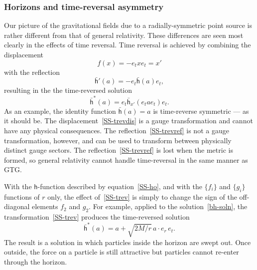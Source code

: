 \documentclass[a4paper]{article}
\numberwithin{equation}{section}
\newcommand{\dt}{\! \cdot \!}
\newcommand{\lih}{\mathsf{h}}
\newcommand{\lbh}{\bar{\mathsf{h}}}
\newcommand{\ho}{\lbh}
\begin{document}
\subsubsection*{Horizons and time-reversal asymmetry}

Our picture of the gravitational fields due to a radially-symmetric
point source is rather different from that of general relativity.
These differences are seen most clearly in the effects of time
reversal.  Time reversal is achieved by combining the displacement
%
\begin{equation}
f(x) = - e_t x e_t = x'
\label{SS-trevdis}
\end{equation}
%
with the reflection
%
\begin{equation}
\ho'(a) = - e_t \ho(a) e_t,
\label{SS-trevref}
\end{equation}
%
resulting in the the time-reversed solution
%
\begin{equation}
\ho^\ast(a) = e_t \ho_{x'}(e_t a e_t) e_t.
\label{SS-trev}
\end{equation}
%
As an example, the identity function $\ho(a)=a$ is time-reverse
symmetric --- as it should be.  The displacement~\eqref{SS-trevdis} is
a gauge transformation and cannot have any physical consequences.  The
reflection~\eqref{SS-trevref} is not a gauge transformation, however,
and can be used to transform between physically distinct gauge
sectors.  The reflection~\eqref{SS-trevref} is lost when the metric is
formed, so general relativity cannot handle time-reversal in the same
manner as GTG.


With the $\lih$-function described by equation~\eqref{SS-ho}, and with the
$\{f_i\}$ and $\{g_i\}$ functions of $r$ only, the effect
of~\eqref{SS-trev} is simply to change the sign of the off-diagonal
elements $f_2$ and $g_2$.  For example, applied to the
solution~\eqref{bh-soln}, the transformation~\eqref{SS-trev} produces the
time-reversed solution
%
\begin{equation}
\ho^\ast(a) = a + \sqrt{2M/r} \, a \dt e_r \, e_t.
\label{bh-solnT}
\end{equation}
%
The result is a solution in which particles inside the horizon are
swept out.  Once outside, the force on a particle is still attractive
but particles cannot re-enter through the horizon.
\end{document}
